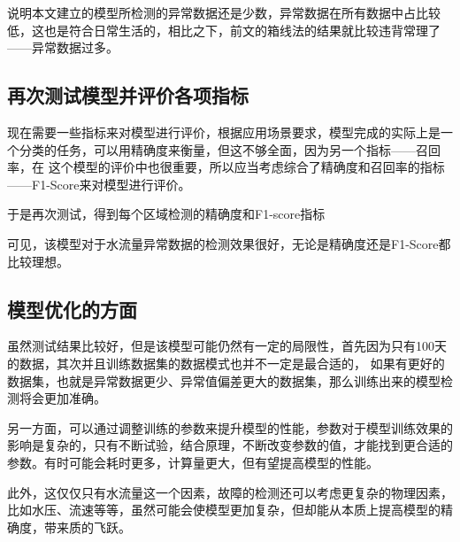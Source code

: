 \documentclass[UTF8]{article}
\begin{document}
			说明本文建立的模型所检测的异常数据还是少数，异常数据在所有数据中占比较低，这也是符合日常生活的，相比之下，前文的箱线法的结果就比较违背常理了——异常数据过多。
			\subsection{再次测试模型并评价各项指标}
				\par 现在需要一些指标来对模型进行评价，根据应用场景要求，模型完成的实际上是一个分类的任务，可以用精确度来衡量，但这不够全面，因为另一个指标——召回率，在
				这个模型的评价中也很重要，所以应当考虑综合了精确度和召回率的指标——F1-Score来对模型进行评价。
				\par 于是再次测试，得到每个区域检测的精确度和F1-score指标
				\begin{table}[!ht]
					\centering
				\end{table}
			可见，该模型对于水流量异常数据的检测效果很好，无论是精确度还是F1-Score都比较理想。
				\subsection{模型优化的方面}
				\par 虽然测试结果比较好，但是该模型可能仍然有一定的局限性，首先因为只有100天的数据，其次并且训练数据集的数据模式也并不一定是最合适的，
				如果有更好的数据集，也就是异常数据更少、异常值偏差更大的数据集，那么训练出来的模型检测将会更加准确。
				\par 另一方面，可以通过调整训练的参数来提升模型的性能，参数对于模型训练效果的影响是复杂的，只有不断试验，结合原理，不断改变参数的值，才能找到更合适的参数。有时可能会耗时更多，计算量更大，但有望提高模型的性能。
				\par 此外，这仅仅只有水流量这一个因素，故障的检测还可以考虑更复杂的物理因素，比如水压、流速等等，虽然可能会使模型更加复杂，但却能从本质上提高模型的精确度，带来质的飞跃。
	\newpage
	
	
	\newpage
\end{document}

